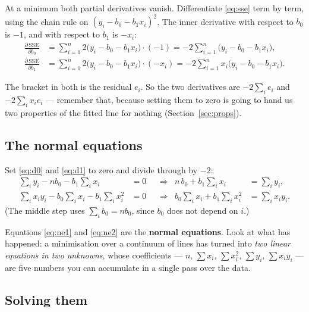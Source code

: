 \documentclass[11pt]{article}
\begin{document}
At a minimum both partial derivatives vanish. Differentiate \eqref{eq:sse}
term by term, using the chain rule on $(y_i - b_0 - b_1x_i)^2$. The inner
derivative with respect to $b_0$ is $-1$, and with respect to $b_1$ is
$-x_i$:
\begin{align}
  \frac{\partial\,\mathrm{SSE}}{\partial b_0}
    &= \sum_{i=1}^{n} 2\bigl(y_i - b_0 - b_1x_i\bigr)\cdot(-1)
     = -2\sum_{i=1}^{n}\bigl(y_i - b_0 - b_1x_i\bigr),
       \label{eq:d0}\\
  \frac{\partial\,\mathrm{SSE}}{\partial b_1}
    &= \sum_{i=1}^{n} 2\bigl(y_i - b_0 - b_1x_i\bigr)\cdot(-x_i)
     = -2\sum_{i=1}^{n} x_i\bigl(y_i - b_0 - b_1x_i\bigr).
       \label{eq:d1}
\end{align}

The bracket in both is the residual $e_i$. So the two derivatives are
$-2\sum_i e_i$ and $-2\sum_i x_ie_i$ --- remember that, because setting them
to zero is going to hand us two properties of the fitted line for nothing
(Section~\ref{sec:props}).

\subsection{The normal equations}

Set \eqref{eq:d0} and \eqref{eq:d1} to zero and divide through by $-2$:
\begin{align}
  \sum_i y_i - nb_0 - b_1\sum_i x_i &= 0
    &&\Longrightarrow&
    n\,b_0 + b_1\sum_i x_i &= \sum_i y_i, \label{eq:ne1}\\
  \sum_i x_iy_i - b_0\sum_i x_i - b_1\sum_i x_i^2 &= 0
    &&\Longrightarrow&
    b_0\sum_i x_i + b_1\sum_i x_i^2 &= \sum_i x_iy_i. \label{eq:ne2}
\end{align}
(The middle step uses $\sum_i b_0 = nb_0$, since $b_0$ does not depend on
$i$.)

Equations \eqref{eq:ne1} and \eqref{eq:ne2} are the \textbf{normal
equations}. Look at what has happened: a minimisation over a continuum of
lines has turned into \emph{two linear equations in two unknowns}, whose
coefficients --- $n$, $\sum x_i$, $\sum x_i^2$, $\sum y_i$, $\sum x_iy_i$ ---
are five numbers you can accumulate in a single pass over the data.

\subsection{Solving them}
\end{document}
